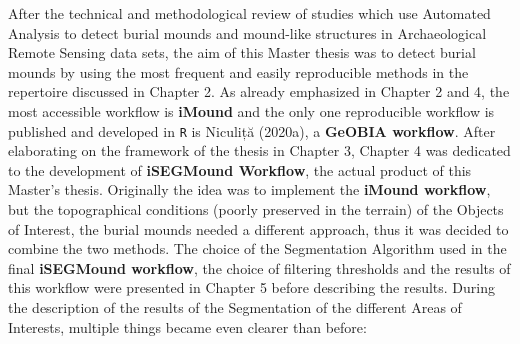 \documentclass[
  12pt,
]{article}
\begin{document}
After the technical and methodological review of studies which use Automated Analysis to detect burial mounds and mound-like structures in Archaeological Remote Sensing data sets, the aim of this Master thesis was to detect burial mounds by using the most frequent and easily reproducible methods in the repertoire discussed in Chapter 2. As already emphasized in Chapter 2 and 4, the most accessible workflow is \textbf{iMound} and the only one reproducible workflow is published and developed in \texttt{R} is Niculiță (2020a), a \textbf{GeOBIA workflow}. After elaborating on the framework of the thesis in Chapter 3, Chapter 4 was dedicated to the development of \textbf{iSEGMound Workflow}, the actual product of this Master's thesis. Originally the idea was to implement the \textbf{iMound workflow}, but the topographical conditions (poorly preserved in the terrain) of the Objects of Interest, the burial mounds needed a different approach, thus it was decided to combine the two methods.
The choice of the Segmentation Algorithm used in the final \textbf{iSEGMound workflow}, the choice of filtering thresholds and the results of this workflow were presented in Chapter 5 before describing the results. During the description of the results of the Segmentation of the different Areas of Interests, multiple things became even clearer than before:
\end{document}
